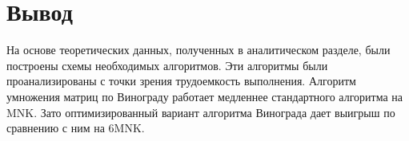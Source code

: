 \section{Вывод}
На основе теоретических данных, полученных в аналитическом разделе, были построены схемы необходимых алгоритмов. Эти алгоритмы были проанализированы с точки зрения трудоемкость выполнения. Алгоритм умножения матриц по Винограду работает медленнее стандартного алгоритма на MNK. Зато оптимизированный вариант алгоритма  Винограда дает выигрыш по сравнению с ним на 6MNK.